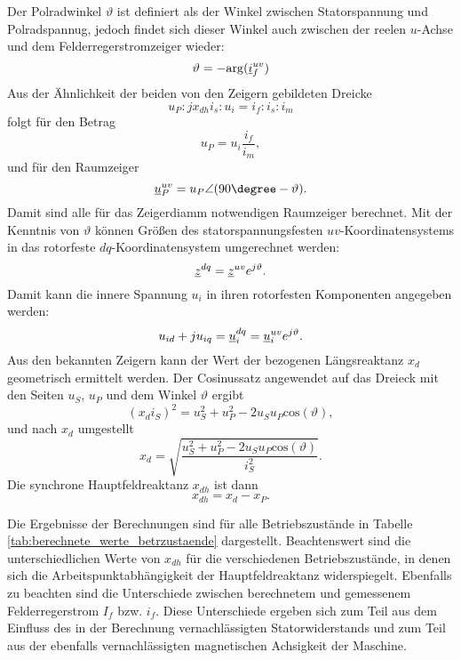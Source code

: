 \noindent Der Polradwinkel $\vartheta$ ist definiert als der Winkel zwischen Statorspannung und Polradspannug, jedoch findet sich dieser Winkel auch zwischen der reelen $u$-Achse und dem Felderregerstromzeiger wieder:
\begin{equation*}
    \vartheta=-\mathrm{arg}(\underline{i}^{uv}_f)
\end{equation*}
Aus der Ähnlichkeit der beiden von den Zeigern gebildeten Dreicke
\begin{equation*}
    u_P : j x_{dh} i_s : u_i = i_f : i_s : i_m
\end{equation*}
folgt für den Betrag
\begin{equation*}
    u_P = u_i \frac{i_f}{i_m},
\end{equation*}
und für den Raumzeiger
\begin{equation*}
    \zuv{u}_P = u_P \angle (90\degree-\vartheta).
\end{equation*}
Damit sind alle für das Zeigerdiamm notwendigen Raumzeiger berechnet.
Mit der Kenntnis von $\vartheta$ können Größen des statorspannungsfesten $uv$-Koordinatensystems in das rotorfeste $dq$-Koordinatensystem umgerechnet werden:
\begin{equation*}
    \underline{z}^{dq} = \underline{z}^{uv} e^{j \vartheta}.
\end{equation*}
Damit kann die innere Spannung $u_i$ in ihren rotorfesten Komponenten angegeben werden:
\begin{equation*}
    u_{id}+j u_{iq} = \underline{u}^{dq}_i = \underline{u}^{uv}_i e^{j \vartheta}.
\end{equation*}
Aus den bekannten Zeigern kann der Wert der bezogenen Längsreaktanz $x_d$ geometrisch ermittelt werden. Der Cosinussatz angewendet auf das Dreieck mit den Seiten $u_S$, $u_P$ und dem Winkel $\vartheta$ ergibt
\begin{equation*}
    (x_d i_S)^2 = u_S^2 +u_P^2-2 u_S u_P \mathrm{cos}(\vartheta),
\end{equation*}
und nach $x_d$ umgestellt
\begin{equation*}
    x_d=\sqrt{\frac{u_S^2 +u_P^2-2 u_S u_P \mathrm{cos}(\vartheta)}{i_S^2}}.
\end{equation*}
Die synchrone Hauptfeldreaktanz $x_{dh}$ ist dann
\begin{equation*}
    x_{dh}=x_d-x_P.
\end{equation*}

\noindent Die Ergebnisse der Berechnungen sind für alle Betriebszustände in Tabelle \ref{tab:berechnete_werte_betrzustaende} dargestellt.
Beachtenswert sind die unterschiedlichen Werte von $x_{dh}$ für die verschiedenen Betriebszustände, in denen sich die Arbeitspunktabhängigkeit der Hauptfeldreaktanz widerspiegelt.
Ebenfalls zu beachten sind die Unterschiede zwischen berechnetem und gemessenem Felderregerstrom $I_f$ bzw. $i_f$. Diese Unterschiede ergeben sich zum Teil aus dem Einfluss des in der Berechnung vernachlässigten Statorwiderstands und zum Teil aus der ebenfalls vernachlässigten magnetischen Achsigkeit der Maschine. 

